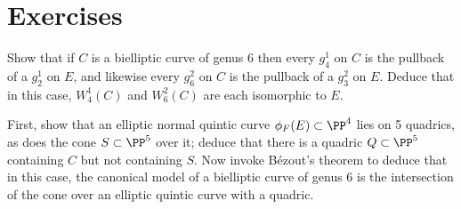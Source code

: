 \section{Exercises}

\begin{exercise}
Show that if $C$ is a bielliptic curve of genus 6 then every $g^1_4$ on $C$ is the pullback of a $g^1_2$ on $E$, and likewise  every $g^2_6$ on $C$ is the pullback of a $g^2_3$ on $E$. Deduce that in this case, $W^1_4(C)$ and $W^2_6(C)$ are each isomorphic to $E$.
\end{exercise}

%

%
%
%
%


\begin{exercise}
First, show that an elliptic normal quintic curve $\phi_F(E) \subset \PP^4$ lies on 5 quadrics, as does the cone $S \subset \PP^5$ over it; deduce that there is a quadric $Q \subset \PP^5$ containing $C$ but not containing $S$. Now invoke B\'ezout's theorem to deduce that in this case, the canonical model of a bielliptic curve of genus 6 is the intersection of the cone over an elliptic quintic curve with a quadric.
\end{exercise}


